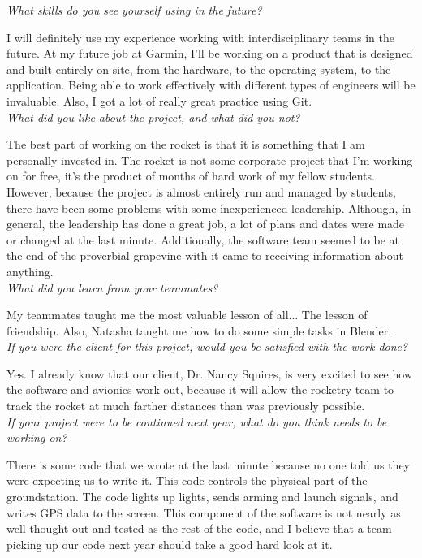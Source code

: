 \documentclass[10pt,draftclsnofoot,onecolumn]{IEEEtran}
\begin{document}
\begin{itemize}
	\textit{What skills do you see yourself using in the future?}

	I will definitely use my experience working with interdisciplinary teams in the future. At my future job at Garmin, I'll be working on a product that is designed and built entirely on-site, from the hardware, to the operating system, to the application. Being able to work effectively with different types of engineers will be invaluable. Also, I got a lot of really great practice using Git.\\

	\textit{What did you like about the project, and what did you not?}

	The best part of working on the rocket is that it is something that I am personally invested in. The rocket is not some corporate project that I'm working on for free, it's the product of months of hard work of my fellow students. However, because the project is almost entirely run and managed by students, there have been some problems with some inexperienced leadership. Although, in general, the leadership has done a great job, a lot of plans and dates were made or changed at the last minute. Additionally, the software team seemed to be at the end of the proverbial grapevine with it came to receiving information about anything.\\

	\textit{What did you learn from your teammates?}

	My teammates taught me the most valuable lesson of all... The lesson of friendship. Also, Natasha taught me how to do some simple tasks in Blender.\\

	\textit{If you were the client for this project, would you be satisfied with the work done?}

	Yes. I already know that our client, Dr. Nancy Squires, is very excited to see how the software and avionics work out, because it will allow the rocketry team to track the rocket at much farther distances than was previously possible.\\

	\textit{If your project were to be continued next year, what do you think needs to be working on?}

	There is some code that we wrote at the last minute because no one told us they were expecting us to write it. This code controls the physical part of the groundstation. The code lights up lights, sends arming and launch signals, and writes GPS data to the screen. This component of the software is not nearly as well thought out and tested as the rest of the code, and I believe that a team picking up our code next year should take a good hard look at it.\\
\end{itemize}
\end{document}
